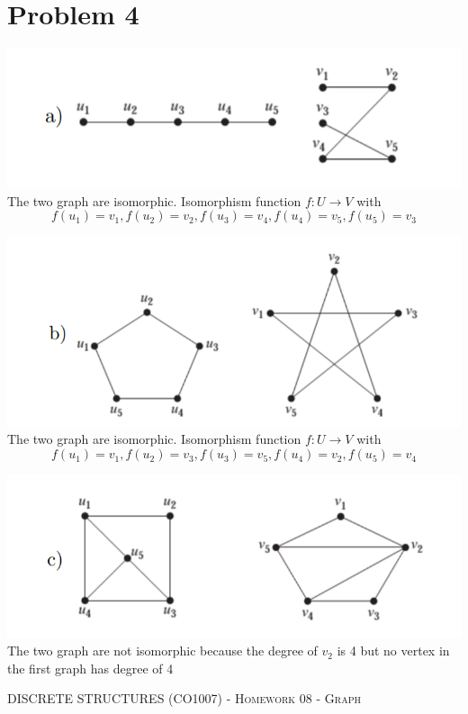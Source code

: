 \documentclass{article}
\begin{document}
\bigskip

\bigskip 
\section*{Problem 4}
\includegraphics[scale = 0.8]{problem_4/graph_4.a.png}
\newline
The two graph are isomorphic. Isomorphism function $ f : U \rightarrow V $ with
$$ f(u_1) = v_1, f(u_2) = v_2, f(u_3) = v_4, f(u_4) = v_5, f(u_5) = v_3 $$

\includegraphics[scale = 0.8]{problem_4/graph_4.b.png}
\newline
The two graph are isomorphic. Isomorphism function $ f : U \rightarrow V $ with
$$ f(u_1) = v_1, f(u_2) = v_3, f(u_3) = v_5, f(u_4) = v_2, f(u_5) = v_4 $$

\includegraphics[scale = 0.8]{problem_4/graph_4.c.png}
\newline
The two graph are not isomorphic because the degree of $v_2$ is 4 but no vertex in the first graph has degree of 4
\newpage

{\scshape } \hfill {\scshape DISCRETE STRUCTURES (CO1007) - Homework 08 - Graph} \hfill {\scshape }
 
\end{document}

